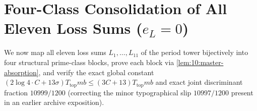 \section{Four-Class Consolidation of All Eleven Loss Sums ($e_L = 0$)}
\label{sec:10:four-class}

We now map all eleven loss sums $L_1, \dots, L_{11}$ of the period tower bijectively into four structural prime-class blocks, prove each block via \cref{lem:10:master-absorption}, and verify the exact global constant $(2\log 4 \cdot C + 13\sigma) T_{\mathrm{top}} m b \le (3C + 13) T_{\mathrm{top}} m b$ and exact joint discriminant fraction $10999/1200$ (correcting the minor typographical slip $10997/1200$ present in an earlier archive exposition).


